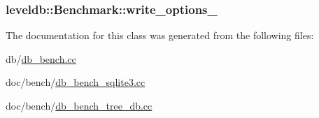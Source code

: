 \hypertarget{classleveldb_1_1_benchmark_a0e4811e2580f4777fc4a5c1abb855d62}{
\subsubsection[{write\-\_\-options\-\_\-}]{ leveldb\-::\-Benchmark\-::write\-\_\-options\-\_\-\hspace{0.3cm}{\ttfamily [private]}}}\label{classleveldb_1_1_benchmark_a0e4811e2580f4777fc4a5c1abb855d62}


The documentation for this class was generated from the following files\-:\begin{DoxyCompactItemize}
\item 
db/\hyperlink{db__bench_8cc}{db\-\_\-bench.\-cc}\item 
doc/bench/\hyperlink{db__bench__sqlite3_8cc}{db\-\_\-bench\-\_\-sqlite3.\-cc}\item 
doc/bench/\hyperlink{db__bench__tree__db_8cc}{db\-\_\-bench\-\_\-tree\-\_\-db.\-cc}\end{DoxyCompactItemize}
